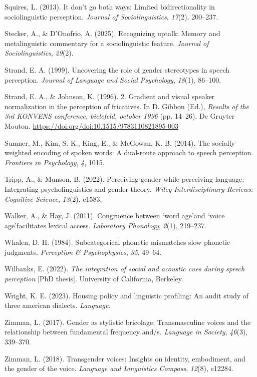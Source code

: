 \documentclass[
  letterpaper,
  DIV=11,
  numbers=noendperiod]{scrartcl}
\newlength{\cslhangindent}
\newenvironment{CSLReferences}[2] %
 {\begin{list}{}{%
  \setlength{\itemindent}{0pt}
  \setlength{\leftmargin}{0pt}
  \setlength{\parsep}{0pt}
  \ifodd #1
   \setlength{\leftmargin}{\cslhangindent}
   \setlength{\itemindent}{-1\cslhangindent}
  \fi
  \setlength{\itemsep}{#2\baselineskip}}}
 {\end{list}}
\begin{document}
\begin{CSLReferences}{1}{0}
Squires, L. (2013). It don't go both ways: Limited bidirectionality in
sociolinguistic perception. \emph{Journal of Sociolinguistics},
\emph{17}(2), 200--237.

Stecker, A., \& D'Onofrio, A. (2025). Recognizing uptalk: Memory and
metalinguistic commentary for a sociolinguistic feature. \emph{Journal
of Sociolinguistics}, \emph{29}(2).

Strand, E. A. (1999). Uncovering the role of gender stereotypes in
speech perception. \emph{Journal of Language and Social Psychology},
\emph{18}(1), 86--100.

Strand, E. A., \& Johnson, K. (1996). 2. Gradient and visual speaker
normalization in the perception of fricatives. In D. Gibbon (Ed.),
\emph{Results of the 3rd KONVENS conference, bielefeld, october 1996}
(pp. 14--26). De Gruyter Mouton.
\url{https://doi.org/doi:10.1515/9783110821895-003}

Sumner, M., Kim, S. K., King, E., \& McGowan, K. B. (2014). The socially
weighted encoding of spoken words: A dual-route approach to speech
perception. \emph{Frontiers in Psychology}, \emph{4}, 1015.

Tripp, A., \& Munson, B. (2022). Perceiving gender while perceiving
language: Integrating psycholinguistics and gender theory. \emph{Wiley
Interdisciplinary Reviews: Cognitive Science}, \emph{13}(2), e1583.

Walker, A., \& Hay, J. (2011). Congruence between `word age'and `voice
age'facilitates lexical access. \emph{Laboratory Phonology},
\emph{2}(1), 219--237.

Whalen, D. H. (1984). Subcategorical phonetic mismatches slow phonetic
judgments. \emph{Perception \& {Psychophysics}}, \emph{35}, 49--64.

Wilbanks, E. (2022). \emph{The integration of social and acoustic cues
during speech perception} {[}PhD thesis{]}. University of California,
Berkeley.

Wright, K. E. (2023). Housing policy and linguistic profiling: An audit
study of three american dialects. \emph{Language}.

Zimman, L. (2017). Gender as stylistic bricolage: Transmasculine voices
and the relationship between fundamental frequency and/s. \emph{Language
in Society}, \emph{46}(3), 339--370.

Zimman, L. (2018). Transgender voices: Insights on identity, embodiment,
and the gender of the voice. \emph{Language and Linguistics Compass},
\emph{12}(8), e12284.

\end{CSLReferences}
\end{document}
